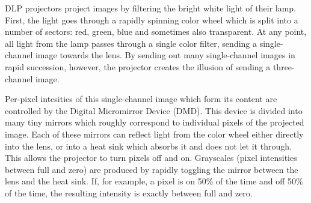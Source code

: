 DLP projectors project images by filtering the bright white light of their lamp. First, the light goes through a rapidly spinning color wheel which is split into a number of sectors: red, green, blue and sometimes also transparent. At any point, all light from the lamp passes through a single color filter, sending a single-channel image towards the lens. By sending out many single-channel images in rapid succession, however, the projector creates the illusion of sending a three-channel image.

Per-pixel intesities of this single-channel image which form its content are controlled by the Digital Micromirror Device (DMD). This device is divided into many tiny mirrors which roughly correspond to individual pixels of the projected image. Each of these mirrors can reflect light from the color wheel either directly into the lens, or into a heat sink which absorbs it and does not let it through. This allows the projector to turn pixels off and on. Grayscales (pixel intensities between full and zero) are produced by rapidly toggling the mirror between the lens and the heat sink. If, for example, a pixel is on 50\% of the time and off 50\% of the time, the resulting intensity is exactly between full and zero.

